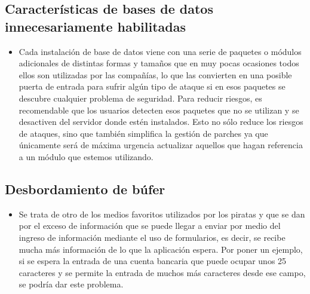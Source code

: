 \documentclass[%
 reprint,
 amsmath,amssymb,
 aps,
]{revtex4-1}
\begin{document}
\subsection{ Características de bases de datos innecesariamente habilitadas}
\begin{itemize}
\item Cada instalación de base de datos viene con una serie de paquetes o módulos adicionales de distintas
formas y tamaños que en muy pocas ocasiones todos ellos son utilizadas por las compañías, lo que las
convierten en una posible puerta de entrada para sufrir algún tipo de ataque si en esos paquetes se
descubre cualquier problema de seguridad. Para reducir riesgos, es recomendable que los usuarios
detecten esos paquetes que no se utilizan y se desactiven del servidor donde estén instalados. Esto no sólo
reduce los riesgos de ataques, sino que también simplifica la gestión de parches ya que únicamente será de
máxima urgencia actualizar aquellos que hagan referencia a un módulo que estemos utilizando.
\end{itemize}
\subsection{Desbordamiento de búfer}
\begin{itemize}
\item Se trata de otro de los medios favoritos utilizados por los piratas y que se dan por el exceso de información
que se puede llegar a enviar por medio del ingreso de información mediante el uso de formularios, es decir,
se recibe mucha más información de lo que la aplicación espera. Por poner un ejemplo, si se espera la
entrada de una cuenta bancaria que puede ocupar unos 25 caracteres y se permite la entrada de muchos
más caracteres desde ese campo, se podría dar este problema.
\end{itemize}
\end{document}
